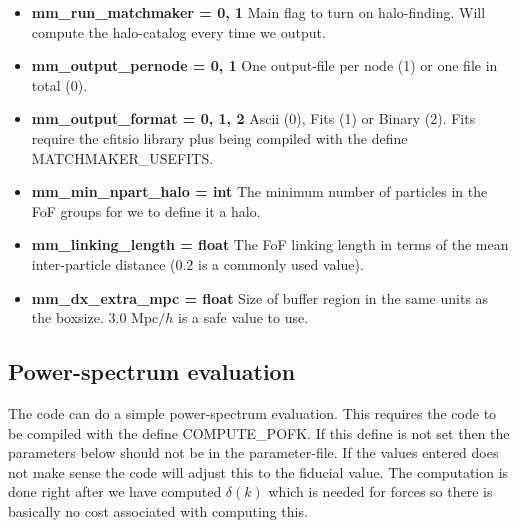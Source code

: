 \documentclass[usenatbib]{article}
\begin{document}
\begin{itemize}

\item \textbf{mm\_run\_matchmaker = 0, 1} Main flag to turn on halo-finding. Will compute the halo-catalog every time we output.

\item \textbf{mm\_output\_pernode = 0, 1} One output-file per node (1) or one file in total (0).

\item \textbf{mm\_output\_format = 0, 1, 2} Ascii (0), Fits (1) or Binary (2). Fits require the cfitsio library plus being compiled with the define MATCHMAKER\_USEFITS.

\item \textbf{mm\_min\_npart\_halo = int} The minimum number of particles in the FoF groups for we to define it a halo.

\item \textbf{mm\_linking\_length = float} The FoF linking length in terms of the mean inter-particle distance ($0.2$ is a commonly used value).

\item \textbf{mm\_dx\_extra\_mpc = float} Size of buffer region in the same units as the boxsize. $3.0$ Mpc$/h$ is a safe value to use.

\end{itemize}

\subsection*{Power-spectrum evaluation}

The code can do a simple power-spectrum evaluation. This requires the code to be compiled with the define COMPUTE\_POFK. If this define is not set then the parameters below should not be in the parameter-file. If the values entered does not make sense the code will adjust this to the fiducial value. The computation is done right after we have computed $\delta(k)$ which is needed for forces so there is basically no cost associated with computing this.
\end{document}
